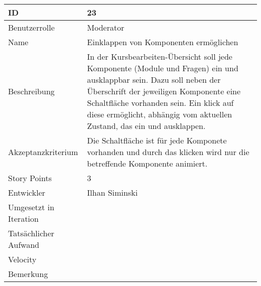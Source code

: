 \begin{tabularx}{\textwidth}{|p{}|X|}
	\hline
	ID & 23\\
	\hline
	Benutzerrolle & Moderator\\
	\hline
	Name & Einklappen von Komponenten ermöglichen\\
	\hline
	Beschreibung & In der Kursbearbeiten-Übersicht soll jede Komponente (Module und Fragen) ein und ausklappbar sein.
		Dazu soll neben der Überschrift der jeweiligen Komponente eine Schaltfläche vorhanden sein.
		Ein klick auf diese ermöglicht, abhängig vom aktuellen Zustand, das ein und ausklappen. \\
	\hline
	Akzeptanzkriterium & Die Schaltfläche ist für jede Komponete vorhanden und durch das klicken wird nur die betreffende Komponente animiert.\\
	\hline
	Story Points & 3 \\
	\hline
	Entwickler & Ilhan Siminski\\
	\hline
	Umgesetzt in Iteration & \\
	\hline
	Tatsächlicher Aufwand & \\
	\hline
	Velocity & \\
	\hline
	Bemerkung & \\
	\hline
\end{tabularx}
\vspace{20pt}
